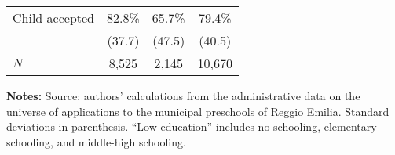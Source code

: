 \begin{table}[!ht]
\begin{center}
\begin{tabular}{l*{3}{c}}
Child accepted &       82.8\% &       65.7\% &       79.4\%\\
             &     (37.7) &     (47.5) &     (40.5)\\
\hline
\(N\)        &       8,525 &      2,145  &      10,670 \\
\hline
\end{tabular}
\end{center}
\begin{flushleft}
\tiny{
{\bfseries Notes:} Source: authors' calculations from the administrative data on the universe of applications to the municipal preschools of Reggio Emilia. Standard deviations in parenthesis. ``Low education'' includes no schooling, elementary schooling, and middle-high schooling.}
\end{flushleft}
\end{table}


